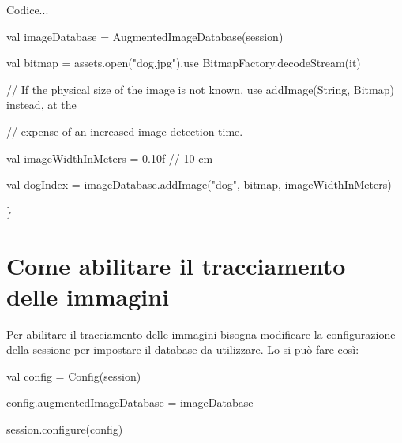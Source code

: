 \documentclass[crop=false, class=book]{standalone}
\begin{document}
\begin{center}
	\begin{minipage}{0.95\textwidth}
	
	Codice...

val imageDatabase = AugmentedImageDatabase(session)

val bitmap = assets.open("dog.jpg").use { BitmapFactory.decodeStream(it) }

// If the physical size of the image is not known, use addImage(String, Bitmap) instead, at the

// expense of an increased image detection time.

val imageWidthInMeters = 0.10f // 10 cm

val dogIndex = imageDatabase.addImage("dog", bitmap, imageWidthInMeters)

  
\}
	
	\end{minipage}
\end{center}

\section{Come abilitare il tracciamento delle immagini}
Per abilitare il tracciamento delle immagini bisogna modificare la configurazione della sessione per impostare il database da utilizzare. Lo si può fare così:

\begin{center}
	\begin{minipage}{0.95\textwidth}
	
	val config = Config(session)
	
config.augmentedImageDatabase = imageDatabase

session.configure(config)

	
	
	\end{minipage}
\end{center}
\end{document}
